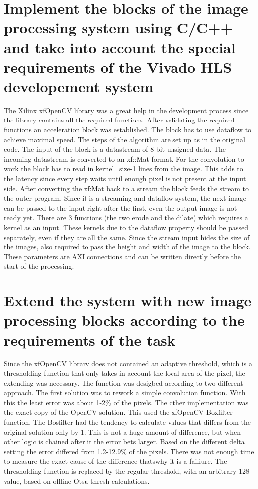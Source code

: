 \section{Implement the blocks of the image processing system using C/C++ and take into account the special requirements of the Vivado HLS developement system} %
The Xilinx xfOpenCV library was a great help in the development process since the library contains all the required functions.
After validating the required functions an acceleration block was established.
The block has to use dataflow to achieve maximal speed.
The steps of the algorithm are set up as in the original code.
The input of the block is a datastream of 8-bit unsigned data.
The incoming datastream is converted to an xf::Mat format.
For the convolution to work the block has to read in kernel\_size-1 lines from the image.
This adds to the latency since every step waits until enough pixel is not present at the input side.
After converting the xf:Mat back to a stream the block feeds the stream to the outer program.
Since it is a streaming and dataflow system, the next image can be passed to the input right after the first, even the output image is not ready yet.
There are 3 functions (the two erode and the dilate) which requires a kernel as an input.
These kernels due to the dataflow property should be passed separately, even if they are all the same.
Since the stream input hides the size of the images, also required to pass the height and width of the image to the block.
These parameters are AXI connections and can be written directly before the start of the processing.

\section{Extend the system with new image processing blocks according to the requirements of the task} %
Since the xfOpenCV library does not contained an adaptive threshold, which is a thresholding function that only takes in account the local area of the pixel, the extending was necessary.
The function was desigbed according to two different approach.
The first solution was to rework a simple convolution function.
With this the least error was about 1-2\% of the pixels.
The other implementation was the exact copy of the OpenCV solution.
This used the xfOpenCV Boxfilter function.
The Bosfilter had the tendency to calculate values that differs from the original solution only by 1.
This is not a huge amount of difference, but when other logic is chained after it the error bets larger.
Based on the different delta setting the error differed from 1.2-12.9\% of the pixels.
There was not enough time to measure the exact cause of the difference thatswhy it is a failiure.
The thresholding function is replaced by the regular threshold, with an arbitrary 128 value, based on offline Otsu thresh calculations.

